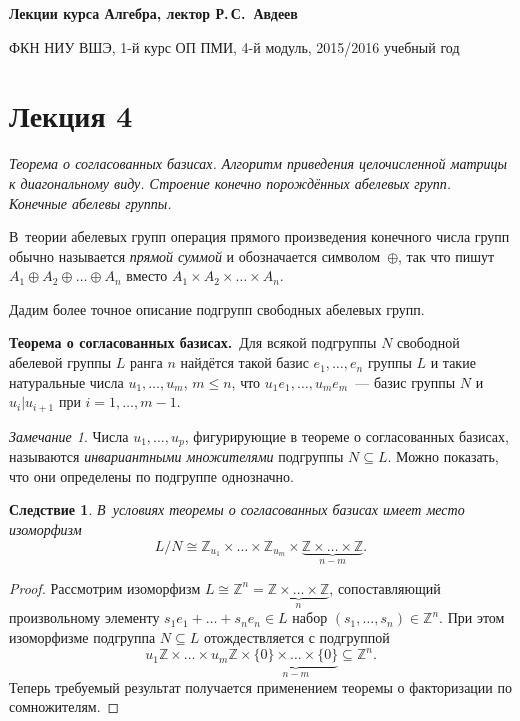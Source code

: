 \documentclass[a4paper,10pt]{amsart}
\def\ZZ{{\mathbb Z}}%
\newtheorem{corollary}{Следствие}
\theoremstyle{definition}
\theoremstyle{remark}
\newtheorem{remark}{Замечание}
\begin{document}
%
\sloppy
%
\centerline{\large \bf Лекции курса \guillemotleft
Алгебра\guillemotright{}, лектор Р.\,С.~Авдеев}

\smallskip

\centerline{\large ФКН НИУ ВШЭ, 1-й курс ОП ПМИ, 4-й модуль,
2015/2016 учебный год}


\bigskip

\section*{Лекция 4}

\medskip

{\it Теорема о согласованных базисах. Алгоритм
приведения целочисленной матрицы к диагональному виду. Строение конечно порождённых абелевых групп. Конечные абелевы группы. } %

В~теории абелевых групп операция прямого произведения конечного
числа групп обычно называется \textit{прямой суммой} и обозначается
символом~$\oplus$, так что пишут $A_1 \oplus A_2 \oplus \ldots
\oplus A_n$ вместо $A_1 \times A_2 \times \ldots \times A_n$.

Дадим более точное описание подгрупп свободных абелевых групп.

\smallskip

{\bf Теорема о согласованных базисах.}\ Для всякой подгруппы $N$
свободной абелевой группы $L$ ранга $n$ найдётся такой базис $e_1,
\ldots, e_n$ группы $L$ и такие натуральные числа $u_1, \ldots,
u_m$, $m \leqslant n$, что $u_1 e_1, \ldots, u_m e_m$~--- базис
группы $N$ и $u_i | u_{i+1}$ при $i = 1, \ldots, m-1$.

\smallskip

\begin{remark}
Числа $u_1, \ldots, u_p$, фигурирующие в теореме о согласованных
базисах, называются {\it инвариантными множителями} подгруппы $N
\subseteq L$. Можно показать, что они определены по подгруппе
однозначно.
\end{remark}

\begin{corollary}
В~условиях теоремы о согласованных базисах имеет место изоморфизм
$$
L / N \cong \ZZ_{u_1} \times \ldots \times \ZZ_{u_m} \times
\underbrace{\ZZ \times \ldots \times \ZZ}_{n - m}.
$$
\end{corollary}

\begin{proof}
Рассмотрим изоморфизм $L \cong \ZZ^n = \underbrace{\ZZ \times \ldots
\times \ZZ}_n$, сопоставляющий произвольному элементу $s_1 e_1 +
\ldots + s_n e_n \in L$ набор $(s_1, \ldots, s_n) \in \ZZ^n$. При
этом изоморфизме подгруппа $N \subseteq L$ отождествляется с
подгруппой
$$
u_1 \ZZ \times \ldots \times u_m \ZZ \times \underbrace{\lbrace 0
\rbrace \times \ldots \times \lbrace 0 \rbrace}_{n-m} \subseteq
\ZZ^n.
$$
Теперь требуемый результат получается применением теоремы о
факторизации по сомножителям.
\end{proof}
\end{document}

